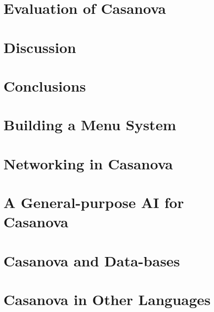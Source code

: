 \documentclass[12pt,american,VeneziaPhdThesis]{PhdThesis}%
\begin{document}
\chapter{Evaluation of Casanova}
\label{chap:evaluation}
 

\chapter{Discussion}
\label{chap:discussion}
 

\chapter{Conclusions}
\label{chap:conclusions}
 

\backmatter

 

\printindex

\appendix
\chapter{Building a Menu System}
\label{chap:menu_system}
 

\chapter{Networking in Casanova}
\label{chap:networking}
 

\chapter{A General-purpose AI for Casanova}
\label{chap:goap}


\chapter{Casanova and Data-bases}
\label{chap:casanova_and_dbs}
 

\chapter{Casanova in Other Languages}
\label{chap:casanova_in_haskell_and_cpp}

\end{document}
